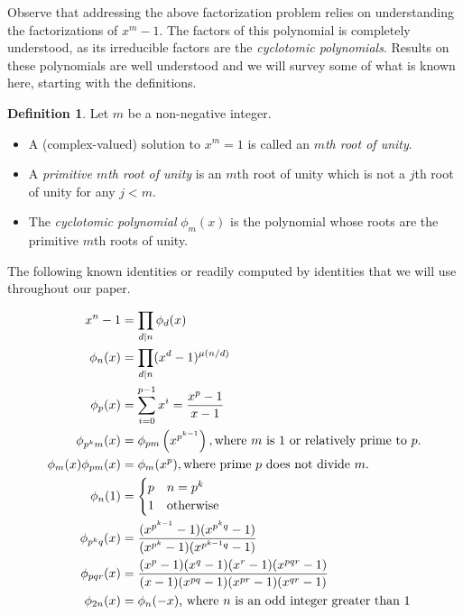 \documentclass[11pt]{amsart}
\numberwithin{equation}{section}
\theoremstyle{plain}
\theoremstyle{definition}
\newtheorem{definition}[equation]{Definition}
\begin{document}
Observe that addressing the above factorization problem relies on understanding the factorizations of $x^m-1$. The factors of this polynomial is completely understood, as its irreducible factors are the \textit{cyclotomic polynomials}. Results on these polynomials are well understood and we will survey some of what is known here, starting with the definitions.

\begin{definition}
Let $m$ be a non-negative integer. 
\begin{itemize}
\item A (complex-valued) solution to $x^m=1$ is called an \textit{$m$th root of unity}.
\item A \textit{primitive $m$th root of unity} is an $m$th root of unity which is not a $j$th root of unity for any $j<m$.
\item The \textit{cyclotomic polynomial} $\phi_m(x)$ is the polynomial whose roots are the primitive $m$th roots of unity.
\end{itemize}
\end{definition}

The following known identities or readily computed by identities that we will use throughout our paper. 

\begin{align}
x^n-1 &=\prod_{d|n}\phi_d(x)\label{eq:prod_cyc}\\
\phi_n(x) &=\prod_{d|n}(x^d-1)^{\mu(n/d)}\label{eq:prod_roots}\\
\phi_p(x)&=\sum_{i=0}^{p-1}x^i={x^p-1\over x-1}\label{eq:cyc_prime}\\
\phi_{p^km}(x)&=\phi_{pm}\left(x^{p^{k-1}}\right), \text{where $m$ is $1$ or relatively prime to $p$.}\label{eq:cyc_prime_power_mult}\\
\phi_m(x)\phi_{pm}(x) &=\phi_m(x^p), \text{where prime $p$ does not divide $m$.}\label{eq:divisor} \\
\phi_{n}(1)&=\begin{cases}p & n=p^k\\1 & \text{otherwise} \end{cases}\label{eq:eval_prime_power}\\
\phi_{p^kq}(x) &= \frac{(x^{p^{k-1}}-1)(x^{p^kq}-1)} {(x^{p^k}-1)(x^{p^{k-1}q}-1)}\\
\phi_{pqr}(x)&=\frac{(x^p-1)(x^q-1)(x^r-1)(x^{p q r}-1)}{(x-1)(x^{p q}-1)(x^{pr}-1)(x^{q r}-1)}\label{eq:pqr}\\
\phi_{2n}(x)&=\phi_n(-x)\text{, where $n$ is an odd integer greater than 1}
\label{eq:parity}
\end{align}
\end{document}
